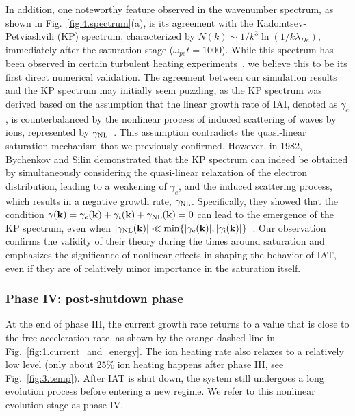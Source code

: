\documentclass[%
 reprint,
 amsmath,
 amssymb,
 aps,
 prx,
floatfix,
superscriptaddress
]{revtex4-2}
\begin{document}
In addition, one noteworthy feature observed in the wavenumber spectrum, as shown in Fig.~\ref{fig:4.spectrum}(a), is its agreement with the Kadomtsev-Petviashvili (KP) spectrum, characterized by $N(k) \sim 1/k^3 \ln(1/k\lambda_{De})$, immediately after the saturation stage ($\omega_{pe}t=1000$). 
While this spectrum has been observed in certain turbulent heating experiments~\cite{hamberger1972experimental,perepelkin1973nonlinear,de1991experimental}, we believe this to be its first direct numerical validation.
The agreement between our simulation results and the KP spectrum may initially seem puzzling, as the KP spectrum was derived based on the assumption that the linear growth rate of IAI, denoted as $\gamma_e$, is counterbalanced by the nonlinear process of induced scattering of waves by ions, represented by $\gamma_{\rm{NL}}$~\cite{kadomtsev1962turbulence,petviashvili1963ion}.  This assumption contradicts the quasi-linear saturation mechanism that we previously confirmed.
However, in 1982, Bychenkov and Silin demonstrated that the KP spectrum can indeed be obtained by simultaneously considering the quasi-linear relaxation of the electron distribution, leading to a weakening of $\gamma_e$, and the induced scattering process, which results in a negative growth rate, $\gamma_{\rm{NL}}$. 
Specifically, they showed that the condition $\gamma(\mathbf{k}) = \gamma_e (\mathbf{k}) + \gamma_i (\mathbf{k}) + \gamma_{\rm{NL}} (\mathbf{k}) = 0$ can lead to the emergence of the KP spectrum, even when $|\gamma_{\rm{NL}}(\mathbf{k})|\ll \rm{min}\{|\gamma_{e}(\mathbf{k})|,|\gamma_{i}(\mathbf{k})|  \}$~\cite{bychenkov1982ion,bychenkov1988ion}.
Our observation confirms the validity of their theory during the times around saturation and emphasizes the significance of nonlinear effects in shaping the behavior of IAT, even if they are of relatively minor importance in the saturation itself.


\subsubsection{\label{sec:phase4}Phase IV: post-shutdown phase}
At the end of phase III, the current growth rate returns to a value that is close to the free acceleration rate, as shown by the orange dashed line in Fig.~\ref{fig:1.current_and_energy}.
The ion heating rate also relaxes to a relatively low level (only about 25\% ion heating happens after phase III, see Fig.~\ref{fig:3.temp}). %
After IAT is shut down, the system still undergoes a long evolution process before entering a new regime. 
We refer to this nonlinear evolution stage as phase IV.
\end{document}
